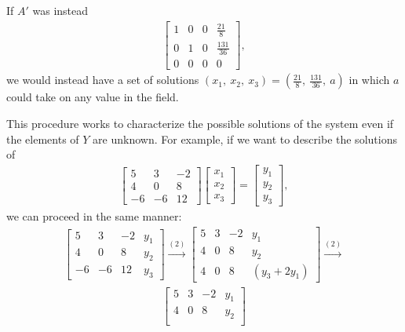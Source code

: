 \documentclass[12pt]{article}
\begin{document}
\begin{comm}
  If $A'$ was instead
  \begin{align*}
    \begin{bmatrix}
      1 & 0 & 0 & \frac{21}{8}\\
      0 & 1 & 0 & \frac{131}{36}\\
      0 & 0 & 0 & 0
    \end{bmatrix},
  \end{align*}
  we would instead have a set of solutions $(x_1,\ x_2,\ x_3) =
  (\frac{21}{8},\ \frac{131}{36},\ a)$ in which $a$ could take on
  any value in the field.

  This procedure works to characterize the possible solutions of
  the system even if the elements of $Y$ are unknown. For
  example, if we want to describe the solutions of
  \begin{align*}
    \begin{bmatrix}
      5  & 3  & -2\\
      4  & 0  & 8 \\
      -6 & -6 & 12
    \end{bmatrix}
    \begin{bmatrix}
      x_1\\
      x_2\\
      x_3
    \end{bmatrix}
    =
    \begin{bmatrix}
      y_1\\
      y_2\\
      y_3
    \end{bmatrix},
  \end{align*}
  we can proceed in the same manner:
  \begin{align*}
    \begin{bmatrix}
      5  & 3  & -2 & y_1\\
      4  & 0  & 8  & y_2\\
      -6 & -6 & 12 & y_3
    \end{bmatrix}
    \xrightarrow{(2)}
    \begin{bmatrix}
      5 & 3 & -2 & y_1\\
      4 & 0 & 8  & y_2\\
      4 & 0 & 8  & (y_3 + 2y_1)
    \end{bmatrix}
    \xrightarrow{(2)}
  \end{align*}
  \begin{align*}
    \begin{bmatrix}
      5 & 3 & -2 & y_1\\
      4 & 0 & 8  & y_2\\

\end{bmatrix}
\end{align*}
\end{comm}
\end{document}
